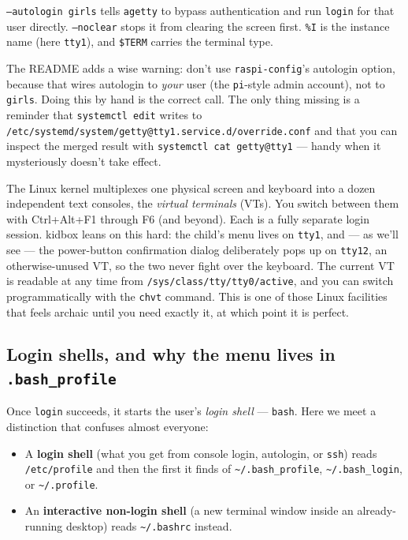 \documentclass[11pt,oneside]{article}
\newcommand{\code}[1]{\texorpdfstring{\textcolor{kbblue}{\texttt{#1}}}{#1}}
\newcommand{\file}[1]{\textcolor{kbteal}{\texttt{#1}}}
\begin{document}
\code{--autologin girls} tells \texttt{agetty} to bypass authentication and run
\texttt{login} for that user directly. \code{--noclear} stops it from clearing
the screen first. \code{\%I} is the instance name (here \texttt{tty1}), and
\code{\$TERM} carries the terminal type.

\begin{fieldnote}
The README adds a wise warning: don't use \texttt{raspi-config}'s autologin
option, because that wires autologin to \emph{your} user (the \texttt{pi}-style
admin account), not to \texttt{girls}. Doing this by hand is the correct call.
The only thing missing is a reminder that \texttt{systemctl edit} writes to
\file{/etc/systemd/system/getty@tty1.service.d/override.conf} and that you can
inspect the merged result with \texttt{systemctl cat getty@tty1} --- handy when
it mysteriously doesn't take effect.
\end{fieldnote}

\begin{deeper}
The Linux kernel multiplexes one physical screen and keyboard into a dozen
independent text consoles, the \emph{virtual terminals} (VTs). You switch
between them with Ctrl+Alt+F1 through F6 (and beyond). Each is a fully separate
login session. kidbox leans on this hard: the child's menu lives on
\texttt{tty1}, and --- as we'll see --- the power-button confirmation dialog
deliberately pops up on \texttt{tty12}, an otherwise-unused VT, so the two never
fight over the keyboard. The current VT is readable at any time from
\file{/sys/class/tty/tty0/active}, and you can switch programmatically with the
\texttt{chvt} command. This is one of those Linux facilities that feels archaic
until you need exactly it, at which point it is perfect.
\end{deeper}

\subsection{Login shells, and why the menu lives in \file{.bash\_profile}}

Once \texttt{login} succeeds, it starts the user's \emph{login shell} ---
\texttt{bash}. Here we meet a distinction that confuses almost everyone:

\begin{itemize}
\item A \textbf{login shell} (what you get from console login, autologin, or
\texttt{ssh}) reads \file{/etc/profile} and then the first it finds of
\file{\textasciitilde/.bash\_profile}, \file{\textasciitilde/.bash\_login}, or
\file{\textasciitilde/.profile}.
\item An \textbf{interactive non-login shell} (a new terminal window inside an
already-running desktop) reads \file{\textasciitilde/.bashrc} instead.
\end{itemize}
\end{document}
